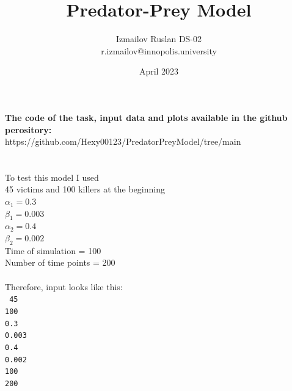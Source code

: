 \documentclass{article}
\title{Predator-Prey Model}
\author{ Izmailov Ruslan DS-02 \\ r.izmailov@innopolis.university }
\date{April 2023}
\begin{document}
\maketitle

\textbf{The code of the task, input data and plots available in the github perository: }\\
https://github.com/Hexy00123/PredatorPreyModel/tree/main \\ \\ \\ 

To test this model I used \\
45 victims and 100 killers at the beginning \\ 
$\alpha_1 = 0.3$\\
$\beta_1 = 0.003$\\ 
$\alpha_2 = 0.4$\\ 
$\beta_2 = 0.002$\\ 
Time of simulation = 100\\
Number of time points = 200\\ \\ 
Therefore, input looks like this: \\ 
\texttt{
45 \\
100 \\
0.3 \\ 
0.003 \\ 
0.4 \\ 
0.002 \\ 
100 \\ 
200 \\ 
}
\end{document}
